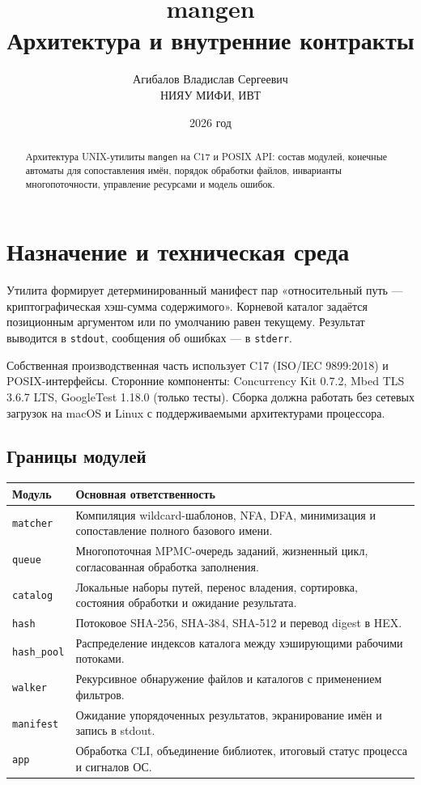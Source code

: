 \documentclass[12pt,a4paper]{article}
\title{mangen\\Архитектура и внутренние контракты}
\author{Агибалов Владислав Сергеевич\\НИЯУ МИФИ, ИВТ}
\date{2026 год}
\begin{document}
\maketitle
\begin{abstract}
Архитектура UNIX-утилиты \texttt{mangen} на C17 и POSIX API: состав модулей,
конечные автоматы для сопоставления имён, порядок обработки файлов,
инварианты многопоточности, управление ресурсами и модель ошибок.
\end{abstract}
\tableofcontents
\newpage

\section{Назначение и техническая среда}

Утилита формирует детерминированный манифест пар «относительный путь ---
криптографическая хэш-сумма содержимого». Корневой каталог задаётся
позиционным аргументом или по умолчанию равен текущему. Результат выводится в
\texttt{stdout}, сообщения об ошибках --- в \texttt{stderr}.

Собственная производственная часть использует C17 (ISO/IEC 9899:2018)
и POSIX-интерфейсы. Сторонние компоненты: Concurrency Kit 0.7.2,
Mbed TLS 3.6.7 LTS, GoogleTest 1.18.0 (только тесты). Сборка должна
работать без сетевых загрузок на macOS и Linux с поддерживаемыми
архитектурами процессора.

\subsection{Границы модулей}

\begin{longtable}{P{0.20\textwidth}P{0.71\textwidth}}
\toprule
Модуль & Основная ответственность \\
\midrule
\endhead
\texttt{matcher} & Компиляция wildcard-шаблонов, NFA, DFA, минимизация и сопоставление полного базового имени. \\
\texttt{queue} & Многопоточная MPMC-очередь заданий, жизненный цикл, согласованная обработка заполнения. \\
\texttt{catalog} & Локальные наборы путей, перенос владения, сортировка, состояния обработки и ожидание результата. \\
\texttt{hash} & Потоковое SHA-256, SHA-384, SHA-512 и перевод digest в HEX. \\
\texttt{hash\_pool} & Распределение индексов каталога между хэширующими рабочими потоками. \\
\texttt{walker} & Рекурсивное обнаружение файлов и каталогов с применением фильтров. \\
\texttt{manifest} & Ожидание упорядоченных результатов, экранирование имён и запись в stdout. \\
\texttt{app} & Обработка CLI, объединение библиотек, итоговый статус процесса и сигналов ОС. \\
\bottomrule
\end{longtable}
\end{document}
